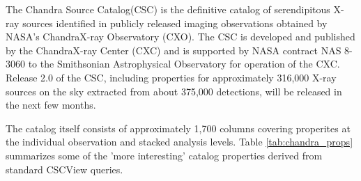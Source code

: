 The Chandra Source Catalog(CSC) is the definitive catalog of serendipitous X-ray sources identified in
publicly released imaging observations obtained by NASA’s ChandraX-ray Observatory (CXO).  The CSC is
developed and published by the ChandraX-ray Center (CXC) and is supported by NASA contract NAS 8-3060
to the Smithsonian Astrophysical Observatory for operation of the CXC.  Release 2.0 of the CSC, including
properties for approximately 316,000 X-ray sources on the sky extracted from about 375,000 detections,
will be released in the next few months. 

The catalog itself consists of approximately 1,700 columns covering properites at the individual observation and stacked analysis levels.
Table \ref{tab:chandra_props} summarizes some of the 'more interesting' catalog properties derived from standard CSCView queries.

